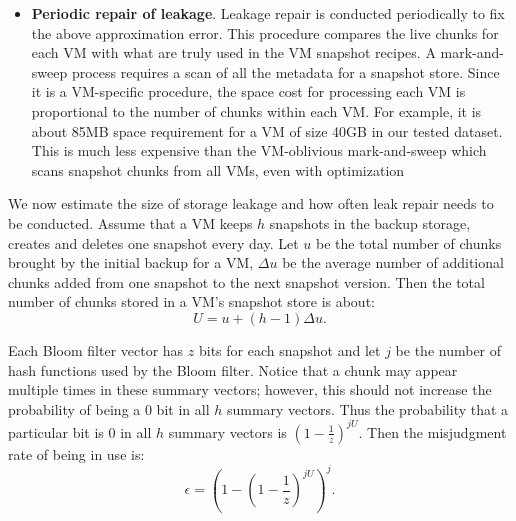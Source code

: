 \begin{itemize}
\item {\bf Periodic repair of leakage}.
Leakage repair is conducted periodically to fix the above approximation error.
This procedure compares the live chunks for each VM with what are truly used in the VM snapshot recipes.
A mark-and-sweep process  requires a scan of all the metadata for a snapshot store.
Since it is a VM-specific procedure, 
the space cost for processing each VM is proportional to the number of chunks
within each VM. For example, it is about 85MB space requirement for a VM of size 40GB in our tested dataset.
 This is  much less expensive  than  the VM-oblivious mark-and-sweep
which scans snapshot chunks from all VMs, even with optimization~\cite{Guo2011}

\end{itemize}

We now estimate the size of storage leakage and how often leak repair needs to be conducted.
Assume that  a VM keeps $h$ snapshots in the backup storage, creates and deletes one snapshot
every day. Let $u$ be the total number of chunks brought by the initial backup for a VM, $\Delta u$ be the average
number of additional chunks added from one snapshot to the next snapshot version. Then the total number of 
chunks stored in a VM's snapshot store is about:
\[
U = u + (h-1)\Delta u.
\]

Each Bloom filter vector has  $z$ bits for each snapshot and let $j$ be the number of hash functions used by the
Bloom filter.  Notice that a chunk may appear multiple times in these summary vectors; however, this should not 
increase the probability of being a 0 bit in all $h$ summary vectors.
Thus the probability that a particular bit is 0  in all $h$ summary vectors is  
$(1- \frac{1}{z}) ^{j U}$. 
Then the misjudgment rate of being in use  is: 
\begin{equation}
\label{eq:falserate}
\epsilon = (1-(1-\frac{1}{z})^{jU})^j.
\end{equation}

